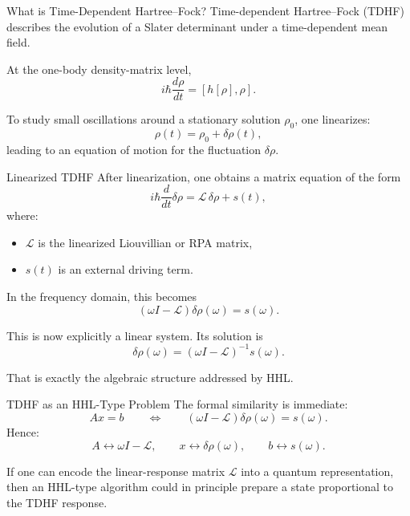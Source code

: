 \documentclass{beamer}
\begin{document}
\begin{frame}{What is Time-Dependent Hartree--Fock?}
  Time-dependent Hartree--Fock (TDHF) describes the evolution of a Slater determinant under a time-dependent mean field.

  At the one-body density-matrix level,
  \[
  i\hbar \frac{d\rho}{dt} = [h[\rho],\rho].
  \]

  To study small oscillations around a stationary solution \(\rho_0\), one linearizes:
  \[
  \rho(t) = \rho_0 + \delta\rho(t),
  \]
  leading to an equation of motion for the fluctuation \(\delta\rho\).
\end{frame}


\begin{frame}{Linearized TDHF}
  After linearization, one obtains a matrix equation of the form
  \[
  i\hbar \frac{d}{dt}\delta \rho = \mathcal{L}\,\delta \rho + s(t),
  \]
  where:
  \begin{itemize}
  \item \(\mathcal{L}\) is the linearized Liouvillian or RPA matrix,
  \item \(s(t)\) is an external driving term.
  \end{itemize}

  In the frequency domain, this becomes
  \[
  (\omega I - \mathcal{L}) \delta \rho(\omega) = s(\omega).
  \]

  This is now explicitly a linear system. Its solution is
  \[
  \delta \rho(\omega) = (\omega I - \mathcal{L})^{-1} s(\omega).
  \]

  That is exactly the algebraic structure addressed by HHL.
\end{frame}


\begin{frame}{TDHF as an HHL-Type Problem}
  The formal similarity is immediate:
  \[
  A x = b
  \qquad \Longleftrightarrow \qquad
  (\omega I - \mathcal{L}) \delta \rho(\omega) = s(\omega).
  \]
  Hence:
  \[
  A \leftrightarrow \omega I - \mathcal{L},
  \qquad
  x \leftrightarrow \delta \rho(\omega),
  \qquad
  b \leftrightarrow s(\omega).
  \]

  If one can encode the linear-response matrix \(\mathcal{L}\) into a quantum representation, then an HHL-type algorithm could in principle prepare a state proportional to the TDHF response.
\end{frame}
\end{document}
